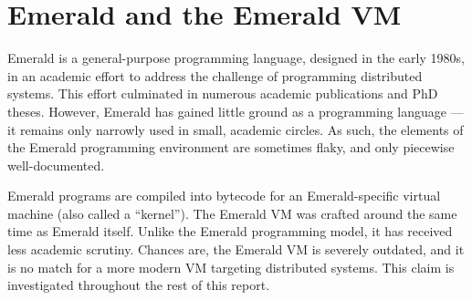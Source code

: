 \section{Emerald and the Emerald VM}

Emerald is a general-purpose programming language, designed in the
early 1980s, in an academic effort to address the challenge of
programming distributed systems. This effort culminated in numerous
academic publications\cite{emerald:tse:1987, emerald:tocs:1988,
emerald:spe:1991} and PhD theses\cite{emerald:phd:norman-c-hutchinson,
emerald:phd:eric-jul, emerald:phd:niels-christian-juul}. However,
Emerald has gained little ground as a programming language --- it
remains only narrowly used in small, academic circles. As such, the
elements of the Emerald programming environment are sometimes flaky,
and only piecewise well-documented.

Emerald programs are compiled into bytecode for an Emerald-specific
virtual machine (also called a ``kernel''\cite{emerald:phd:eric-jul}).
The Emerald VM was crafted around the same time as Emerald itself.
Unlike the Emerald programming model, it has received less academic
scrutiny. Chances are, the Emerald VM is severely outdated, and it is
no match for a more modern VM targeting distributed systems. This
claim is investigated throughout the rest of this report.
